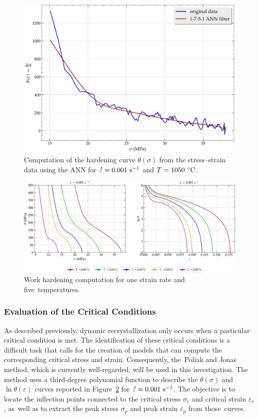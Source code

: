 \documentclass[metals,article,accept,pdftex,moreauthors]{Definitions/mdpi}
\DeclareRobustCommand{\mdot}[1]{\accentset{\mbox{\bfseries .}}{#1}}
\DeclareRobustCommand{\ps}{\text{s}^{-1}}
\begin{document}
\begin{figure}[H]
\centering
\includegraphics[width=0.8\columnwidth]{Figures/AnnTheta}
\caption{Computation of the hardening curve $\theta(\sigma)$ from the stress--strain data using the ANN for $\mdot\varepsilon=0.001~\ps$ and $T=1050~\celsius$.}
\label{fig:AnnTheta}
\end{figure}
\unskip

\begin{figure}[H]
\centering
\includegraphics[width=0.99\columnwidth]{Figures/nThetaOP}
\caption{Work hardening computation for one strain rate and five~temperatures.}
\label{fig:nThetaOP}
\end{figure}
\unskip

\subsubsection{Evaluation of the Critical Conditions}\label{subsec:CrConditions}

As described previously, dynamic recrystallization only occurs when a particular critical condition is met.
The identification of these critical conditions is a difficult task that calls for the creation of models that can compute the corresponding critical stress and strain.
Consequently, the~Poliak and Jonas~\cite{Poliak-1996,Poliak-2003,Poliak-2003-2,Jonas-2003} method, which is currently well-regarded, will be used in this investigation.
The method uses a third-degree polynomial function to describe the $\theta(\sigma)$ and $\ln \theta(\varepsilon)$ curves reported in Figure~\ref{fig:nThetaOP} for $\mdot\varepsilon=0.001~\ps$.
The objective is to locate the inflection points connected to the critical stress $\sigma_c$ and critical strain $\varepsilon_c$, as~well as to extract the peak stress $\sigma_p$ and peak strain $\varepsilon_p$ from those~curves.
\end{document}
